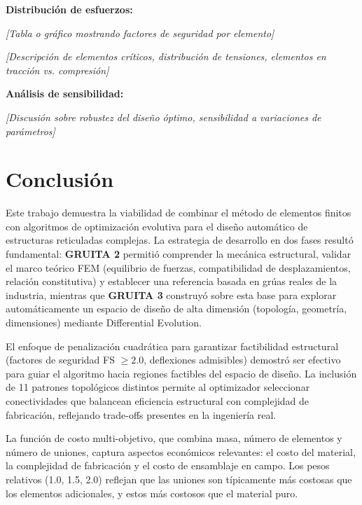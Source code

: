 \documentclass[10pt,a4paper]{article}
\begin{document}
\vspace{0.5cm}

\textbf{Distribución de esfuerzos:}

\textit{[Tabla o gráfico mostrando factores de seguridad por elemento]}

\textit{[Descripción de elementos críticos, distribución de tensiones, elementos en tracción vs. compresión]}

\vspace{0.5cm}

\textbf{Análisis de sensibilidad:}

\textit{[Discusión sobre robustez del diseño óptimo, sensibilidad a variaciones de parámetros]}

\section{Conclusión}

Este trabajo demuestra la viabilidad de combinar el método de elementos finitos con algoritmos de optimización evolutiva para el diseño automático de estructuras reticuladas complejas. La estrategia de desarrollo en dos fases resultó fundamental: \textbf{GRUITA 2} permitió comprender la mecánica estructural, validar el marco teórico FEM (equilibrio de fuerzas, compatibilidad de desplazamientos, relación constitutiva) y establecer una referencia basada en grúas reales de la industria, mientras que \textbf{GRUITA 3} construyó sobre esta base para explorar automáticamente un espacio de diseño de alta dimensión (topología, geometría, dimensiones) mediante Differential Evolution.

El enfoque de penalización cuadrática para garantizar factibilidad estructural (factores de seguridad FS $\geq 2.0$, deflexiones admisibles) demostró ser efectivo para guiar el algoritmo hacia regiones factibles del espacio de diseño. La inclusión de 11 patrones topológicos distintos permite al optimizador seleccionar conectividades que balancean eficiencia estructural con complejidad de fabricación, reflejando trade-offs presentes en la ingeniería real.

La función de costo multi-objetivo, que combina masa, número de elementos y número de uniones, captura aspectos económicos relevantes: el costo del material, la complejidad de fabricación y el costo de ensamblaje en campo. Los pesos relativos (1.0, 1.5, 2.0) reflejan que las uniones son típicamente más costosas que los elementos adicionales, y estos más costosos que el material puro.
\end{document}
